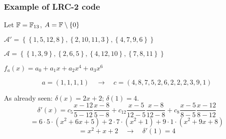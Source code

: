     \begin{frame}
        \frametitle{Example of LRC-2 code}
        
        Let $\mathbb{F} = \mathbb{F}_{13}$, $A = \mathbb{F} \setminus \{0\}$
        
        $\mathcal{A'} = \left\lbrace  \left\lbrace 1, 5, 12 , 8 \right\rbrace, \left\lbrace 2 , 10 , 11 , 3 \right\rbrace , \left\lbrace 4 , 7 , 9 , 6 \right\rbrace \right\rbrace$
        
        $\mathcal{A} = \left\lbrace  \left\lbrace 1 , 3 , 9 \right\rbrace, \left\lbrace 2 , 6 , 5 \right\rbrace , \left\lbrace 4 , 12 , 10 \right\rbrace , \left\lbrace 7 , 8 , 11 \right\rbrace \right\rbrace$
        
        $f_a(x) = a_0 + a_1 x + a_2 x^4 + a_3 x^6$
        
        $$a = (1,1,1,1) \quad \longrightarrow \quad c = (4,8,7,5,2,6,2,2,2,3,9,1)$$
        
        As already seen: $\delta(x) = 2x + 2$; $\delta(1)=4$.
        $$\delta ' (x) = c_5 \frac{x-12}{5-12}\frac{x-8}{5-8} + c_{12} \frac{x-5}{12-5}\frac{x-8}{12-8} + c_8 \frac{x-5}{8-5}\frac{x-12}{8-12}$$
        $$ = 6 \cdot 5 \cdot (x^2 + 6x + 5) + 2 \cdot 7 \cdot (x^2 + 1) + 9 \cdot 1 \cdot (x^2 + 9x + 8)$$
        $$ = x^2 + x + 2 \quad \longrightarrow \quad \delta ' (1) = 4$$
    \end{frame}       